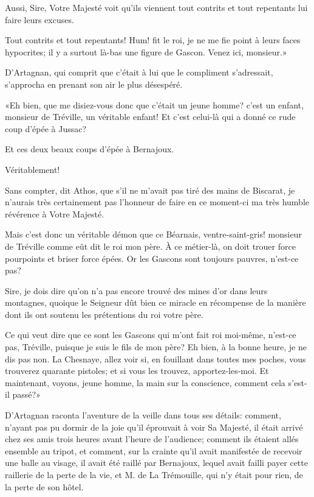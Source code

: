\speak  Aussi, Sire, Votre Majesté voit qu'ils viennent tout contrits et tout repentants lui faire leurs excuses. 

\speak  Tout contrits et tout repentants! Hum! fit le roi, je ne me fie point à leurs faces hypocrites; il y a surtout là-bas une figure de Gascon. Venez ici, monsieur.» 

D'Artagnan, qui comprit que c'était à lui que le compliment s'adressait, s'approcha en prenant son air le plus désespéré. 

«Eh bien, que me disiez-vous donc que c'était un jeune homme? c'est un enfant, monsieur de Tréville, un véritable enfant! Et c'est celui-là qui a donné ce rude coup d'épée à Jussac? 

\speak  Et ces deux beaux coups d'épée à Bernajoux. 

\speak  Véritablement! 

\speak  Sans compter, dit Athos, que s'il ne m'avait pas tiré des mains de Biscarat, je n'aurais très certainement pas l'honneur de faire en ce moment-ci ma très humble révérence à Votre Majesté. 

\speak  Mais c'est donc un véritable démon que ce Béarnais, ventre-saint-gris! monsieur de Tréville comme eût dit le roi mon père. À ce métier-là, on doit trouer force pourpoints et briser force épées. Or les Gascons sont toujours pauvres, n'est-ce pas? 

\speak  Sire, je dois dire qu'on n'a pas encore trouvé des mines d'or dans leurs montagnes, quoique le Seigneur dût bien ce miracle en récompense de la manière dont ils ont soutenu les prétentions du roi votre père. 

\speak  Ce qui veut dire que ce sont les Gascons qui m'ont fait roi moi-même, n'est-ce pas, Tréville, puisque je suis le fils de mon père? Eh bien, à la bonne heure, je ne dis pas non. La Chesnaye, allez voir si, en fouillant dans toutes mes poches, vous trouverez quarante pistoles; et si vous les trouvez, apportez-les-moi. Et maintenant, voyons, jeune homme, la main sur la conscience, comment cela s'est-il passé?» 

D'Artagnan raconta l'aventure de la veille dans tous ses détails: comment, n'ayant pas pu dormir de la joie qu'il éprouvait à voir Sa Majesté, il était arrivé chez ses amis trois heures avant l'heure de l'audience; comment ils étaient allés ensemble au tripot, et comment, sur la crainte qu'il avait manifestée de recevoir une balle au visage, il avait été raillé par Bernajoux, lequel avait failli payer cette raillerie de la perte de la vie, et M. de La Trémouille, qui n'y était pour rien, de la perte de son hôtel. 

